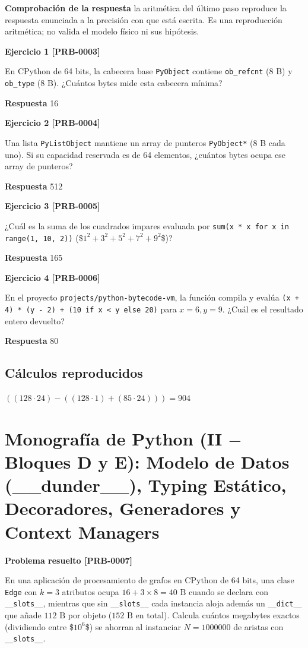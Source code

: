 \documentclass{book}
\begin{document}
\noindent\textbf{Comprobación de la respuesta} la aritmética del último paso reproduce la respuesta enunciada a la precisión con que está escrita. Es una reproducción aritmética; no valida el modelo físico ni sus hipótesis.

\noindent\textbf{Ejercicio 1 [PRB-0003]}

En CPython de 64 bits, la cabecera base \texttt{PyObject} contiene \texttt{ob\_refcnt} (8 B) y \texttt{ob\_type} (8 B). ¿Cuántos bytes mide esta cabecera mínima?

\noindent\textbf{Respuesta} 16

\noindent\textbf{Ejercicio 2 [PRB-0004]}

Una lista \texttt{PyListObject} mantiene un array de punteros \texttt{PyObject*} (8 B cada uno). Si su capacidad reservada es de 64 elementos, ¿cuántos bytes ocupa ese array de punteros?

\noindent\textbf{Respuesta} 512

\noindent\textbf{Ejercicio 3 [PRB-0005]}

¿Cuál es la suma de los cuadrados impares evaluada por \texttt{sum(x * x for x in range(1, 10, 2))} (\$\(1^2 + 3^2 + 5^2 + 7^2 + 9^2\)\$)?

\noindent\textbf{Respuesta} 165

\noindent\textbf{Ejercicio 4 [PRB-0006]}

En el proyecto \texttt{projects/python-bytecode-vm}, la función compila y evalúa \texttt{(x + 4) * (y - 2) + (10 if x < y else 20)} para \(x = 6, y = 9\). ¿Cuál es el resultado entero devuelto?

\noindent\textbf{Respuesta} 80

\subsection*{Cálculos reproducidos}

\(\left(\left(128\cdot 24\right)-\left(\left(128\cdot 1\right)+\left(85\cdot 24\right)\right)\right) = 904\)

\section{Monografía de Python (II \(-\) Bloques D y E): Modelo de Datos (\_\_dunder\_\_), Typing Estático, Decoradores, Generadores y Context Managers}

\noindent\textbf{Problema resuelto [PRB-0007]}

En una aplicación de procesamiento de grafos en CPython de 64 bits, una clase \texttt{Edge} con \(k = 3\) atributos ocupa \(16 + 3 \times 8 = 40\text{ B}\) cuando se declara con \texttt{\_\_slots\_\_}, mientras que sin \texttt{\_\_slots\_\_} cada instancia aloja además un \texttt{\_\_dict\_\_} que añade \(112\text{ B}\) por objeto (\(152\text{ B}\) en total). Calcula cuántos megabytes exactos (dividiendo entre \$\(10^6\)\$) se ahorran al instanciar \(N = 1000000\) de aristas con \texttt{\_\_slots\_\_}.
\end{document}
